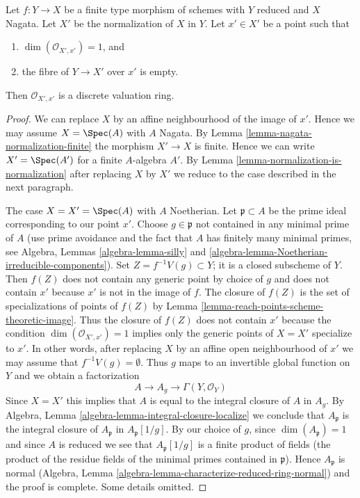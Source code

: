 \begin{lemma}
\label{lemma-relative-normalization-normal-codim-1}
Let $f : Y \to X$ be a finite type morphism of schemes with $Y$ reduced
and $X$ Nagata. Let $X'$ be the normalization of $X$ in $Y$.
Let $x' \in X'$ be a point such that
\begin{enumerate}
\item $\dim(\mathcal{O}_{X', x'}) = 1$, and
\item the fibre of $Y \to X'$ over $x'$ is empty.
\end{enumerate}
Then $\mathcal{O}_{X', x'}$ is a discrete valuation ring.
\end{lemma}

\begin{proof}
We can replace $X$ by an affine neighbourhood of the image of $x'$.
Hence we may assume $X = \Spec(A)$ with $A$ Nagata.
By Lemma \ref{lemma-nagata-normalization-finite}
the morphism $X' \to X$ is finite. Hence we can write
$X' = \Spec(A')$ for a finite $A$-algebra $A'$.
By Lemma \ref{lemma-normalization-is-normalization}
after replacing $X$ by $X'$
we reduce to the case described in the next paragraph.

\medskip\noindent
The case $X = X' = \Spec(A)$ with $A$ Noetherian.
Let $\mathfrak p \subset A$ be the prime ideal
corresponding to our point $x'$. Choose $g \in \mathfrak p$
not contained in any minimal prime of $A$ (use prime avoidance
and the fact that $A$ has finitely many minimal primes, see
Algebra, Lemmas \ref{algebra-lemma-silly} and
\ref{algebra-lemma-Noetherian-irreducible-components}).
Set $Z = f^{-1}V(g) \subset Y$; it is a closed subscheme of $Y$.
Then $f(Z)$ does not contain any generic point by choice of $g$
and does not contain $x'$ because $x'$ is not in the image of $f$.
The closure of $f(Z)$ is the set of specializations of points
of $f(Z)$ by Lemma \ref{lemma-reach-points-scheme-theoretic-image}.
Thus the closure of $f(Z)$ does not contain $x'$ because
the condition $\dim(\mathcal{O}_{X', x'}) = 1$ implies only
the generic points of $X = X'$ specialize to $x'$.
In other words, after replacing $X$ by an affine open
neighbourhood of $x'$ we may assume that $f^{-1}V(g) = \emptyset$.
Thus $g$ maps to an invertible global function on $Y$ and
we obtain a factorization
$$
A \to A_g \to \Gamma(Y, \mathcal{O}_Y)
$$
Since $X = X'$ this implies that $A$ is equal to the integral
closure of $A$ in $A_g$. By
Algebra, Lemma \ref{algebra-lemma-integral-closure-localize}
we conclude that $A_\mathfrak p$ is the integral closure
of $A_\mathfrak p$ in $A_\mathfrak p[1/g]$.
By our choice of $g$, since $\dim(A_\mathfrak p) = 1$
and since $A$ is reduced we see that $A_\mathfrak p[1/g]$
is a finite product of fields (the product of the residue fields
of the minimal primes contained in $\mathfrak p$). Hence $A_\mathfrak p$ is
normal (Algebra, Lemma \ref{algebra-lemma-characterize-reduced-ring-normal})
and the proof is complete. Some details omitted.
\end{proof}






